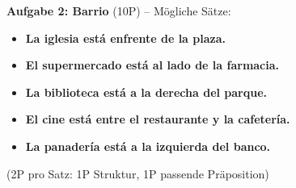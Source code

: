 \documentclass[11pt, a4paper]{article}
\newcommand{\lsg}[1]{\textcolor{loesung}{\textbf{#1}}}
\begin{document}
\vspace{0.5em}

\textbf{Aufgabe 2: Barrio} (10P) -- Mögliche Sätze:
\begin{itemize}
    \item \lsg{La iglesia está enfrente de la plaza.}
    \item \lsg{El supermercado está al lado de la farmacia.}
    \item \lsg{La biblioteca está a la derecha del parque.}
    \item \lsg{El cine está entre el restaurante y la cafetería.}
    \item \lsg{La panadería está a la izquierda del banco.}
\end{itemize}

(2P pro Satz: 1P Struktur, 1P passende Präposition)
\end{document}
